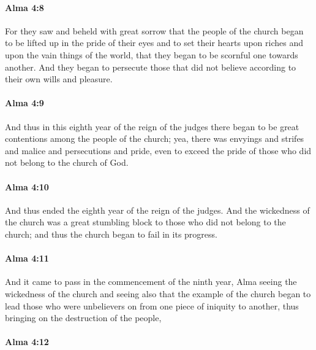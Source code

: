 		\paragraph{Alma 4:8} %
			\label{ALMA-4-8}

			For they saw and beheld with great sorrow
			that the people of the church began to be lifted up in the pride of their eyes
			and to set their hearts upon riches and upon the vain things of the world,
			that they began to be scornful one towards another.
			And they began to persecute those that did not believe
			according to their own wills and pleasure.

		\paragraph{Alma 4:9} %
			\label{ALMA-4-9}

			And thus in this eighth year of the reign of the judges
			there began to be great contentions among the people of the church;
			yea, there was envyings and strifes and malice and persecutions and pride,
			even to exceed the pride of those who did not belong to the church of God.

		\paragraph{Alma 4:10} %
			\label{ALMA-4-10}

			And thus ended the eighth year of the reign of the judges.
			And the wickedness of the church was a great stumbling block
			to those who did not belong to the church;
			and thus the church began to fail in its progress.

		\paragraph{Alma 4:11} %
			\label{ALMA-4-11}

			And it came to pass in the commencement of the ninth year,
			Alma seeing the wickedness of the church
			and seeing also that the example of the church
			began to lead those who were unbelievers on
			from one piece of iniquity to another,
			thus bringing on the destruction of the people,

		\paragraph{Alma 4:12} %
			\label{ALMA-4-12}

